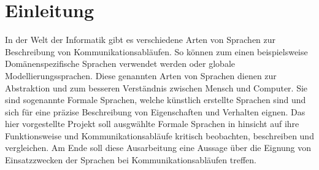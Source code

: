 \chapter{Einleitung}
\label{ch:Einleitung}
In der Welt der Informatik gibt es verschiedene Arten von Sprachen zur Beschreibung von Kommunikationsabläufen. So können zum einen beispielsweise Domänenspezifische Sprachen verwendet werden oder globale Modellierungssprachen. Diese genannten Arten von Sprachen dienen zur Abstraktion und zum besseren Verständnis zwischen Mensch und Computer. Sie sind sogenannte Formale Sprachen, welche künstlich erstellte Sprachen sind und sich für eine präzise Beschreibung von Eigenschaften und Verhalten eignen. Das hier vorgestellte Projekt soll ausgwählte Formale Sprachen in hinsicht auf ihre Funktionsweise und  Kommunikationsabläufe kritisch beobachten, beschreiben und vergleichen. Am Ende soll diese Ausarbeitung eine Aussage über die Eignung von Einsatzzwecken der Sprachen bei Kommunikationsabläufen treffen.




